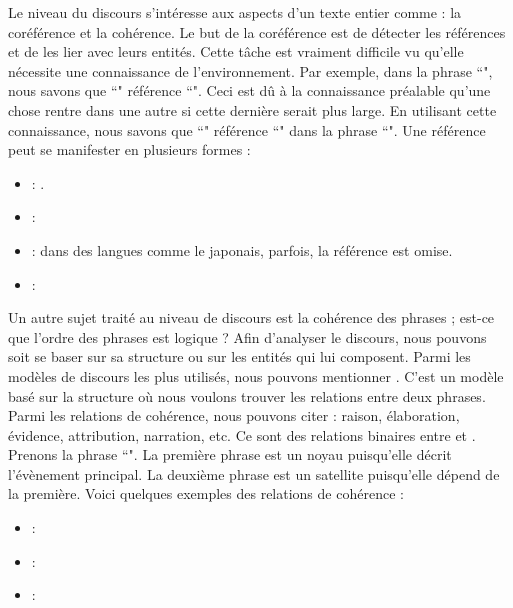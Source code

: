 \documentclass{KodeBook}
\begin{document}
Le niveau du discours s'intéresse aux aspects d'un texte entier comme : la coréférence et la cohérence.
Le but de la coréférence est de détecter les références et de les lier avec leurs entités. 
Cette tâche est vraiment difficile vu qu'elle nécessite une connaissance de l'environnement. 
Par exemple, dans la phrase ``", nous savons que ``" référence ``". 
Ceci est dû à la connaissance préalable qu'une chose rentre dans une autre si cette dernière serait plus large.
En utilisant cette connaissance, nous savons que ``" référence ``" dans la phrase ``".
Une référence peut se manifester en plusieurs formes :
\begin{itemize}
	\item {} : .
	\item {} : 
	\item {} : dans des langues comme le japonais, parfois, la référence est omise.
	\item {} : 
\end{itemize}

Un autre sujet traité au niveau de discours est la cohérence des phrases ; est-ce que l'ordre des phrases est logique ?
Afin d'analyser le discours, nous pouvons soit se baser sur sa structure ou sur les entités qui lui composent. 
Parmi les modèles de discours les plus utilisés, nous pouvons mentionner .
C'est un modèle basé sur la structure où nous voulons trouver les relations entre deux phrases. 
Parmi les relations de cohérence, nous pouvons citer : raison, élaboration, évidence, attribution, narration, etc.
Ce sont des relations binaires entre  et .
Prenons la phrase ``".
La première phrase est un noyau puisqu'elle décrit l'évènement principal.
La deuxième phrase est un satellite puisqu'elle dépend de la première.
Voici quelques exemples des relations de cohérence : 
\begin{itemize}
	\item {} : 
	\item {} : 
	\item {} : 
\end{itemize}
\end{document}
